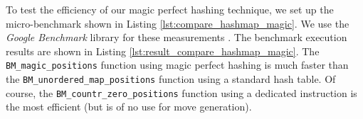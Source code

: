 \documentclass[12pt,a4paper,twoside,openright]{book}
\begin{document}
To test the efficiency of our magic perfect hashing technique, we set up the micro-benchmark shown in Listing \ref{lst:compare_hashmap_magic}. We use the \emph{Google Benchmark} library for these measurements \cite{googlebenchmark2025}. The benchmark execution results are shown in Listing \ref{lst:result_compare_hashmap_magic}. The \texttt{BM_magic_positions} function using magic perfect hashing is much faster than the \texttt{BM_unordered_map_positions} function using a standard hash table. Of course, the \texttt{BM_countr_zero_positions} function using a dedicated instruction is the most efficient (but is of no use for move generation).\\
\end{document}
